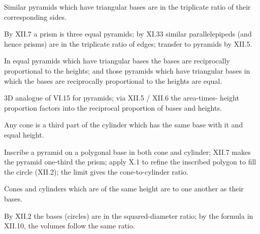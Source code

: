 \begin{claim}
\label{prop:XII.8}
Similar pyramids which have triangular bases are in the triplicate
ratio of their corresponding sides.
\end{claim}
\begin{evidence}
\label{ev:XII.8}
By XII.7 a prism is three equal pyramids; by XI.33 similar
parallelepipeds (and hence prisms) are in the triplicate ratio of
edges; transfer to pyramids by XII.5.
\end{evidence}

\begin{claim}
\label{prop:XII.9}
In equal pyramids which have triangular bases the bases are
reciprocally proportional to the heights; and those pyramids which
have triangular bases in which the bases are reciprocally
proportional to the heights are equal.
\end{claim}
\begin{evidence}
\label{ev:XII.9}
3D analogue of VI.15 for pyramids; via XII.5 / XII.6 the area-times-
height proportion factors into the reciprocal proportion of bases
and heights.
\end{evidence}

\begin{claim}
\label{prop:XII.10}
Any cone is a third part of the cylinder which has the same base
with it and equal height.
\end{claim}
\begin{evidence}
\label{ev:XII.10}
Inscribe a pyramid on a polygonal base in both cone and cylinder;
XII.7 makes the pyramid one-third the prism; apply X.1 to refine the
inscribed polygon to fill the circle (XII.2); the limit gives the
cone-to-cylinder ratio.
\end{evidence}

\begin{claim}
\label{prop:XII.11}
Cones and cylinders which are of the same height are to one another
as their bases.
\end{claim}
\begin{evidence}
\label{ev:XII.11}
By XII.2 the bases (circles) are in the squared-diameter ratio; by
the formula in XII.10, the volumes follow the same ratio.
\end{evidence}

